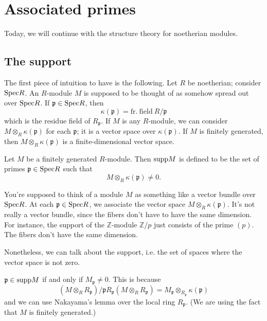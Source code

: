 \section{Associated primes}

\renewcommand{\k}{\kappa}
Today, we will continue with the structure theory for noetherian modules.

\subsection{The support}
The first piece of intuition to have is the following. Let $R$ be noetherian;
consider $\mathrm{Spec} R$. An $R$-module $M$ is supposed to be thought of as somehow
spread out over $\mathrm{Spec} R$. If $\mathfrak{p} \in \mathrm{Spec} R$, then 
\[ \k(\mathfrak{p}) = \mathrm{fr.  \ field \ } R/\mathfrak{p}  \]
which is the residue field of $R_{\mathfrak{p}}$. If $M$ is any $R$-module, we
can consider $M \otimes_R \k(\mathfrak{p})$ for each $\mathfrak{p}$; it is a
vector space over $\k(\mathfrak{p})$. If $M$ is finitely generated, then $M \otimes_R
\k(\mathfrak{p})$ is a finite-dimensional vector space.

\begin{definition} 
Let $M$ be a finitely generated $R$-module. Then $\mathrm{supp} M$ is defined to be the set of primes
$\mathfrak{p} \in \mathrm{Spec} R$ such that
\[ M \otimes_R \k(\mathfrak{p}) \neq 0.  \]
\end{definition} 

You're supposed to think of a module $M$ as something like a vector bundle over
$\mathrm{Spec} R$. At each $\mathfrak{p} \in \mathrm{Spec} R$, we associate the vector space $M
\otimes_R \k(\mathfrak{p})$. It's not really a vector bundle, since the fibers
don't have to have the same dimension. For instance, the support of the
$\mathbb{Z}$-module $\mathbb{Z}/p$ just consists of the prime $(p)$. The fibers
don't have the same dimension.

Nonetheless, we can talk about the support, i.e. the set of spaces where the
vector space is not zero.

\newcommand{\ann}{\mathrm{Ann}}
\begin{remark} 
$\mathfrak{p} \in \mathrm{supp} M$ if and only if $M_{\mathfrak{p}} \neq 0$. This is
because
\[ (M \otimes_R R_{\mathfrak{p}})/ \mathfrak{p} R_{\mathfrak{p}} (M \otimes_R
R_{\mathfrak{p}})  = M_{\mathfrak{p}}
\otimes_{R_{\mathfrak{p}}} \k(\mathfrak{p})  \]
and we can use Nakayama's lemma over the local ring $R_{\mathfrak{p}}$.  (We
are using the fact that $M$ is finitely generated.)
\end{remark} 


